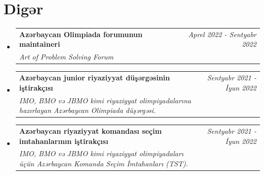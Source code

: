 \documentclass[a4paper,11pt]{article}
\makeatletter
\newcommand{\resumeProject}[4]{
    \vspace{-0.5mm}
\item
    \begin{tabular*}{0.98\textwidth}[t]{l@{\extracolsep{\fill}}r}
        \textbf{#1} & \textit{\footnotesize{#3}} \\
        \footnotesize{\textit{#2}} & \footnotesize{#4}
    \end{tabular*}
    \vspace{-3mm}
}
\newcommand{\resumeSubHeadingListStart}{
\begin{itemize}[leftmargin=*,labelsep=1mm]}
\newcommand{\resumeSubHeadingListEnd}{
                    \end{itemize}\vspace{-2mm}}
\makeatother
\begin{document}
\section{\textbf{Digər}}
\resumeSubHeadingListStart
\resumeProject
{Azərbaycan Olimpiada forumunun maintaineri}
{Art of Problem Solving Forum}
{Aprel 2022 - Sentyabr 2022}
{{}\href{https://artofproblemsolving.com/community/user/948405}{\textcolor{darkblue}{\faIcon{globe}}}}


\resumeProject
{Azərbaycan junior riyaziyyat düşərgəsinin iştirakçısı}
{IMO, BMO və JBMO kimi riyaziyyat olimpiyadalarına hazırlayan Azərbaycan Olimpiada düşərgəsi.}
{Sentyabr 2021 - İyun 2022}
{}
\resumeProject
{Azərbaycan riyaziyyat komandası seçim imtahanlarının iştirakçısı}
{IMO, BMO və JBMO kimi riyaziyyat olimpiyadaları üçün Azərbaycan Komanda Seçim İmtahanları (TST).}
{Sentyabr 2021 - İyun 2022}
{}
\resumeSubHeadingListEnd
\end{document}
